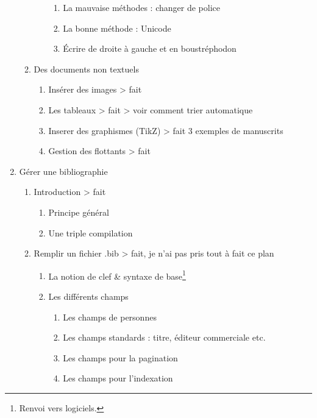 \begin{enumerate}
\begin{enumerate}
\begin{enumerate}
		\begin{enumerate}
			\item La mauvaise méthodes : changer de police
			\item La bonne méthode : Unicode
			\item Écrire de droite à gauche et en boustréphodon
		\end{enumerate}
		\end{enumerate}
	\item Des documents non textuels
		\begin{enumerate}
		\item Insérer des images						> fait
		\item Les tableaux							> fait > voir comment trier automatique
		\item Inserer des graphismes (TikZ)				> fait 3 exemples de manuscrits
		\item Gestion des flottants					> fait
		\end{enumerate}
\end{enumerate}

\item{Gérer une bibliographie}
\begin{enumerate}
\item Introduction									> fait
	\begin{enumerate}
		\item{Principe général}
		\item{Une triple compilation}
	\end{enumerate}
\item Remplir un fichier .bib 						> fait, je n'ai pas pris tout à fait ce plan
	\begin{enumerate}
	\item La notion de clef \& syntaxe de base\footnote{Renvoi vers logiciels.}
	\item Les différents champs
		\begin{enumerate}
			\item Les champs de personnes
			\item Les champs standards : titre, éditeur commerciale etc.
			\item Les champs pour la pagination
			\item Les champs pour l'indexation
			

\end{enumerate}
\end{enumerate}
\end{enumerate}
\end{enumerate}

